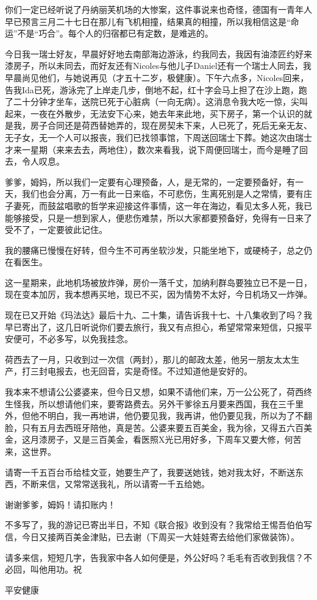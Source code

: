 \par {}
\par 你们一定已经听说了丹纳丽芙机场的大惨案，这件事说来也奇怪，德国有一青年人早已预言三月二十七日在那儿有飞机相撞，结果真的相撞，所以我相信这是“命运”不是“巧合”。每个人的归宿都已有定数，是难逃的。
\par 今日我一瑞士好友，早晨好好地去南部海边游泳，约我同去，我因有油漆匠约好来漆房子，所以未同去，而好友还有Nicoles与他儿子Daniel还有一个瑞士人同去，我早晨尚见他们，与她说再见（才五十二岁，极健康）。下午六点多，Nicoles回来，告我Ida已死，游泳完了上岸走几步，倒地不起，红十字会马上担了在沙上跑，跑了二十分钟才坐车，送院已死于心脏病（一向无病）。这消息令我大吃一惊，尖叫起来，一夜在外散步，无法安下心来，她去年来此地，买下房子，第一个认识的就是我，房子合同还是荷西替她弄的，现在房契未下来，人已死了，死后无亲无友、无子女，无一个人可以报丧，我们已找领事馆，下周送回瑞士下葬。她这次由瑞士才来一星期（来来去去，两地住），数次来看我，说下周便回瑞士，而今是睡了回去，令人叹息。
\par 爹爹，姆妈，所以我们一定要有心理预备，人，是无常的，一定要预备好，有一天，我们也会分离，万一有此一日来临，不可悲伤，生离死别是人之常情，要有庄子妻死，而鼓盆唱歌的哲学来迎接这件事情，这一年在海边，看见太多人死，我已能够接受，只是一想到家人，便悲伤难禁，所以大家都要预备好，免得有一日来了受不了，一定要彼此记住。
\par 我的腰痛已慢慢在好转，但今生不可再坐软沙发，只能坐地下，或硬椅子，总之仍在看医生。
\par 这一星期来，此地机场被放炸弹，房价一落千丈，加纳利群岛要独立已不是一日，现在变本加厉，我本想再买地，现已不买，因为情势不太好，今日机场又一炸弹。
\par 现在已又开始《玛法达》最后十九、二十集，请告诉我十七、十八集收到了吗？我早已寄出了，这几日听说你们要去旅行，我又有点担心，希望常常来短信，只报平安便可，不必多写，以免我挂念。
\par 荷西去了一月，只收到过一次信（两封），那儿的邮政太差，他另一朋友太太生产，打三封电报去，也无回音，实是奇怪。不过知道他是安好的。
\par 我本来不想请公公婆婆来，但今日又想，如果不请他们来，万一公公死了，荷西终生怪我，所以想请他们来，要寄路费去。另外干爹徐五月要来西国，我在三千里外，但他不明白，我一再地讲，他仍要见我，我再讲，他仍要见我，所以为了不翻脸，只有五月去西班牙陪他，真是苦。公婆来要五百美金，我为徐，又得五六百美金，这月漆房子，又是三百美金，看医照X光已用好多，下周车又要大修，何苦来，这世界。
\par 请寄一千五百台币给桂文亚，她要生产了，我要送她钱，她对我太好，不断送东西，不断来信，又常常送我礼，所以请寄一千五给她。
\par 谢谢爹爹，姆妈！请扣账内！
\par 不多写了，我的游记已寄出半日，不知《联合报》收到没有？我常给王惕吾伯伯写信，今日又接两百美金津贴，已去谢（下周买一大娃娃寄去给他们家做装饰）。
\par 请多来信，短短几字，告我家中各人如何便是，外公好吗？毛毛有否收到我信？不必回，叫他用功。祝
\par 平安健康
\par {}



